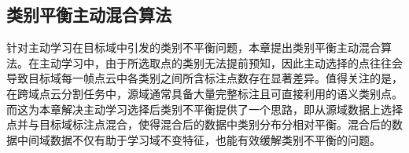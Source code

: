     \subsection{类别平衡主动混合算法}  %
    针对主动学习在目标域中引发的类别不平衡问题，本章提出类别平衡主动混合算法。在主动学习中，由于所选取点的类别无法提前预知，因此主动选择的点往往会导致目标域每一帧点云中各类别之间所含标注点数存在显著差异。值得关注的是，在跨域点云分割任务中，源域通常具备大量完整标注且可直接利用的语义类别点。而这为本章解决主动学习选择后类别不平衡提供了一个思路，即从源域数据上选择点并与目标域标注点混合，使得混合后的数据中类别分布分相对平衡。混合后的数据中间域数据不仅有助于学习域不变特征，也能有效缓解类别不平衡的问题。%

